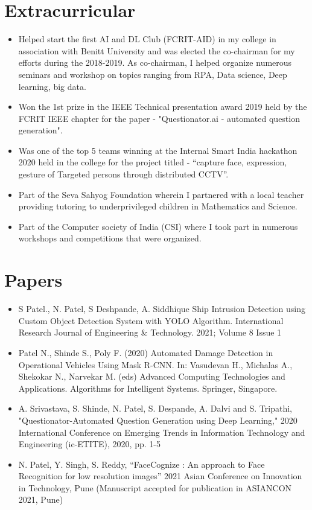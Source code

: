 \documentclass[letterpaper,11pt]{article}
\begin{document}
\section{Extracurricular}
\begin{itemize}
    \item Helped start the first AI and DL Club (FCRIT-AID) in my college in association with Benitt University and was elected the co-chairman for my efforts during the 2018-2019. As co-chairman, I helped organize numerous seminars and workshop on topics ranging from RPA, Data science, Deep learning, big data.  

    \item Won the 1st prize in the IEEE Technical presentation award 2019 held by the FCRIT IEEE chapter for the paper - "Questionator.ai - automated question generation". 

    \item Was one of the top 5 teams winning at the Internal Smart India hackathon 2020 held in the college for the project titled - “capture face, expression, gesture of Targeted persons through distributed CCTV”. 

    \item Part of the Seva Sahyog Foundation wherein I partnered with a local teacher providing tutoring to underprivileged children in Mathematics and Science. 

    \item Part of the Computer society of India (CSI) where I took part in numerous workshops and competitions that were organized. 
    
\end{itemize}


\section{Papers}
\begin{itemize}
    \item S Patel., N. Patel, S Deshpande, A. Siddhique Ship Intrusion Detection using Custom Object Detection System with YOLO Algorithm. International Research Journal of Engineering \& Technology. 2021; Volume 8 Issue 1 

    \item Patel N., Shinde S., Poly F. (2020) Automated Damage Detection in Operational Vehicles Using Mask R-CNN. In: Vasudevan H., Michalas A., Shekokar N., Narvekar M. (eds) Advanced Computing Technologies and Applications. Algorithms for Intelligent Systems. Springer, Singapore. 

    \item A. Srivastava, S. Shinde, N. Patel, S. Despande, A. Dalvi and S. Tripathi, "Questionator-Automated Question Generation using Deep Learning," 2020 International Conference on Emerging Trends in Information Technology and Engineering (ic-ETITE), 2020, pp. 1-5 

    \item N. Patel, Y. Singh, S. Reddy, “FaceCognize : An approach to Face Recognition for low resolution images” 2021 Asian Conference on Innovation in Technology, Pune (Manuscript accepted for publication in ASIANCON 2021, Pune) 

 
\end{itemize}
\end{document}
